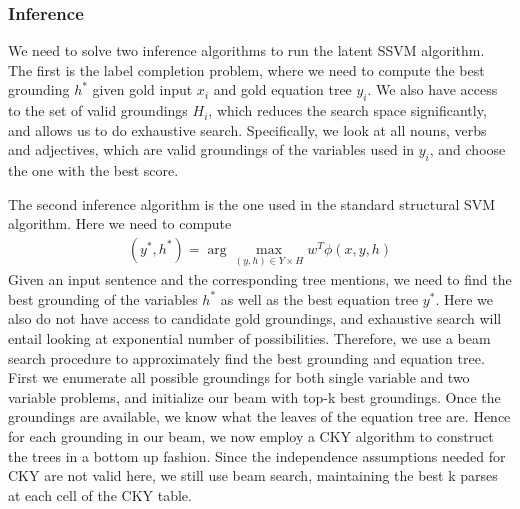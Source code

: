     \subsubsection{Inference}
      We need to solve two inference algorithms to run the latent SSVM
      algorithm.  The first is the label completion problem, where we
      need to compute the best grounding $h^*$ given gold input $x_i$
      and gold equation tree $y_i$. We also have access to the set of
      valid groundings $H_i$, which reduces the search space
      significantly, and allows us to do exhaustive
      search. Specifically, we look at all nouns, verbs and
      adjectives, which are valid groundings of the variables used in
      $y_i$, and choose the one with the best score.

      The second inference algorithm is the one used in the standard
      structural SVM algorithm. Here we need to compute
      \begin{align*}
        (y^*, h^*) = \arg\max_{(y, h) \in Y \times H} w^T\phi(x, y, h)
      \end{align*}  
      Given an input sentence and the corresponding tree mentions, we
      need to find the best grounding of the variables $h^*$ as well
      as the best equation tree $y^*$. Here we also do not have access
      to candidate gold groundings, and exhaustive search will entail
      looking at exponential number of possibilities. Therefore, we
      use a beam search procedure to approximately find the best
      grounding and equation tree. First we enumerate all possible
      groundings for both single variable and two variable problems,
      and initialize our beam with top-k best groundings. Once the
      groundings are available, we know what the leaves of the
      equation tree are. Hence for each grounding in our beam, we now
      employ a CKY algorithm to construct the trees in a bottom up
      fashion. Since the independence assumptions needed for CKY are
      not valid here, we still use beam search, maintaining the best k
      parses at each cell of the CKY table. 
      
      
      


      
      


    
    





